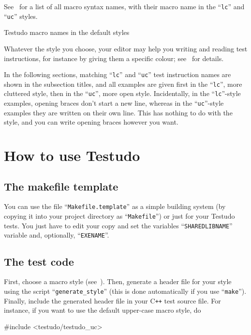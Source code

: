 \documentclass[twoside, a4paper, article]{memoir}
\providecommand*\styletext{%
  first in the ``\texttt{lc}'', more cluttered style, then in the
  ``\texttt{uc}'', more open style}
\providecommand*\openingbracesstyletext{%
  Incidentally, in the ``\texttt{lc}''-style examples, opening braces don't
  start a new line, whereas in the ``\texttt{uc}''-style examples they are
  written on their own line.  This has nothing to do with the style, and you
  can write opening braces however you want.}
\newcommand*\Cpp{C\texttt{++}}
\begin{document}
See~ for a list of all macro syntax names, with
their macro name in the ``\texttt{lc}'' and ``\texttt{uc}'' styles.

\begin{table}
  \centering
  \begin{footnotesize}
    
  \end{footnotesize}
  \caption{Testudo macro names in the default styles}
  \label{tab:testudo-style-table}
\end{table}

Whatever the style you choose, your editor may help you writing and reading
test instructions, for instance by giving them a specific colour;
see~ for details.

In the following sections, matching ``\texttt{lc}'' and ``\texttt{uc}'' test
instruction names are shown in the subsection titles, and all examples are
given \styletext{}.  \openingbracesstyletext{}


\chapter{How to use Testudo}
\label{cha:how-to-use}

\section{The makefile template}
\label{sec:makefile-template}

You can use the file ``\texttt{Makefile.template}'' as a simple building system
(by copying it into your project directory as ``\texttt{Makefile}'') or just
for your Testudo tests.  You just have to edit your copy and set the variables
``\texttt{SHAREDLIBNAME}'' variable and, optionally, ``\texttt{EXENAME}''.

\section{The test code}
\label{sec:test-code}

First, choose a macro style
(see~).  Then, generate a
header file for your style using the script ``\texttt{generate\_style}'' (this
is done automatically if you use ``\texttt{make}'').  Finally, include the
generated header file in your \Cpp{} test source file.  For instance, if you
want to use the default upper-case macro style, do
\begin{cpplisting}
#include <testudo/testudo_uc>
\end{cpplisting}
\end{document}
